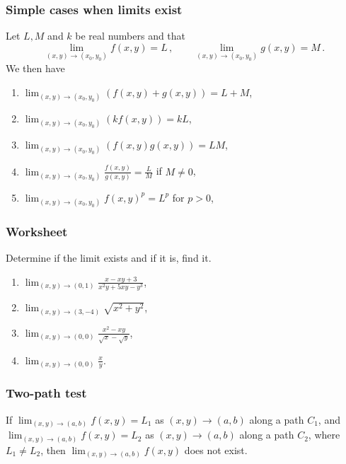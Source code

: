 \documentclass[aspectratio=169,handout]{beamer}
\begin{document}
\begin{frame}
    \frametitle{Simple cases when limits exist}
    \begin{theorem}
Let $L,M$ and $k$ be real numbers and that 
\begin{equation*}
    \lim_{(x,y) \to (x_0,y_0)} f(x,y) = L \,, \qquad 
    \lim_{(x,y) \to (x_0,y_0)} g(x,y) = M \,.
\end{equation*}
We then have

\begin{multicols}{2}
\begin{enumerate}
    \item $\displaystyle \lim_{(x,y) \to (x_0,y_0)} (f(x,y) + g(x,y)) = L + M$,

    \item $\displaystyle  \lim_{(x,y) \to (x_0,y_0)} (k f(x,y)) = kL$,

    \item $\displaystyle \lim_{(x,y) \to (x_0,y_0)} (f(x,y) g(x,y)) = LM$,

    \item $\displaystyle \lim_{(x,y) \to (x_0,y_0)} \frac{f(x,y)}{g(x,y)} = \frac{L}{M}$ if $M \not= 0$,

    \item $\displaystyle \lim_{(x,y) \to (x_0,y_0)} {f(x,y)^p} = L^p$ for $p>0$,
\end{enumerate}
\end{multicols}
   \end{theorem}
\end{frame}


\begin{frame}
    \frametitle{Worksheet}
    Determine if the limit exists and if it is, find it.
    \begin{enumerate}
        \item $\displaystyle \lim_{(x,y) \to (0,1)} \frac{x - xy + 3}{x^2y + 5xy - y^3}$,
        \item $\displaystyle \lim_{(x,y) \to (3,-4)} \sqrt{x^2 + y^2}$,
        \item $\displaystyle \lim_{(x,y) \to (0,0)} \frac{x^2 - xy}{\sqrt{x} - \sqrt{y}}$,
        \item $ \displaystyle \lim_{(x,y) \to (0,0)} \frac{x}{y} $.
    \end{enumerate}
\end{frame}


\begin{frame}
    \frametitle{Two-path test}
If $\lim_{(x,y) \to (a,b)} f(x,y) = L_1$ as $(x,y) \to (a,b)$ along a path $C_1$, 
and $\lim_{(x,y) \to (a,b)} f(x,y) = L_2$ as $(x,y) \to (a,b)$ along a path $C_2$, 
where $L_1 \neq L_2$, then $\lim_{(x,y) \to (a,b)} f(x,y)$ does not exist.
\end{frame}
\end{document}
